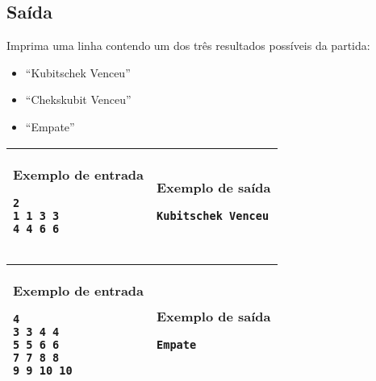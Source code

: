 \subsection*{Saída}

Imprima uma linha contendo  um dos três resultados possíveis da partida:
\begin{itemize}
    \item ``Kubitschek Venceu'' 
    \item ``Chekskubit Venceu'' 
    \item ``Empate'' 
\end{itemize}

\newpage
\begin{table}[!h]
\centering
\begin{tabular}{|l|l|}
\hline
\begin{minipage}[t]{2.5in}
\textbf{Exemplo de entrada}
\begin{verbatim}
2
1 1 3 3
4 4 6 6
\end{verbatim}
\vspace{1mm}
\end{minipage}
&
\begin{minipage}[t]{2.5in}
\textbf{Exemplo de saída}
\begin{verbatim}
Kubitschek Venceu
\end{verbatim}
\vspace{1mm}
\end{minipage} \\
\hline
\end{tabular}
\end{table}

\begin{table}[!h]
\centering
\begin{tabular}{|l|l|}
\hline
\begin{minipage}[t]{2.5in}
\textbf{Exemplo de entrada}
\begin{verbatim}
4
3 3 4 4
5 5 6 6
7 7 8 8
9 9 10 10
\end{verbatim}
\vspace{1mm}
\end{minipage}
&
\begin{minipage}[t]{2.5in}
\textbf{Exemplo de saída}
\begin{verbatim}
Empate
\end{verbatim}
\vspace{1mm}
\end{minipage} \\
\hline
\end{tabular}
\end{table}

